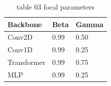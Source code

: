 \begin{table}[t]
\centering
\caption{table 03 focal parameters}
\label{tab:focal_parameters}
\begin{tabular}{lll}
\hline
Backbone & Beta & Gamma \\
\hline
Conv2D & 0.99 & 0.50 \\
Conv1D & 0.99 & 0.25 \\
Transformer & 0.99 & 0.75 \\
MLP & 0.99 & 0.25 \\
\hline
\end{tabular}
\end{table}
